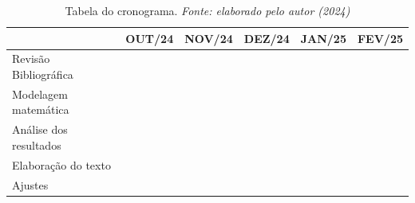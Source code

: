 \documentclass[
	12pt,				%
	openright,			%
	a4paper,			%
	english,			%
	french,				%
	spanish,			%
	brazil				%
	]{article}
\begin{document}
\begin{table}[H]
\begin{tabular}{llllll}
\hline
                        & OUT/24                                          & NOV/24                                          & DEZ/24                                          & JAN/25                                          & FEV/25                   \\ \hline
Revisão Bibliográfica & \cellcolor[HTML]{656565}{\color[HTML]{333333} } & \cellcolor[HTML]{656565}{\color[HTML]{333333} } & \cellcolor[HTML]{656565}{\color[HTML]{333333} } & \cellcolor[HTML]{656565}{\color[HTML]{333333} } & \cellcolor[HTML]{656565} \\ \hline
Modelagem matemática    &                                                 & \cellcolor[HTML]{656565}{\color[HTML]{333333} } & \cellcolor[HTML]{656565}                        &                                                 &                          \\ \hline
Análise dos resultados  &                                                 & \cellcolor[HTML]{656565}{\color[HTML]{333333} } & \cellcolor[HTML]{656565}{\color[HTML]{333333} } & \cellcolor[HTML]{656565}                        &                          \\ \hline
Elaboração do texto     &                                                 &                                                 & \cellcolor[HTML]{656565}{\color[HTML]{333333} } & \cellcolor[HTML]{656565}{\color[HTML]{333333} } & \cellcolor[HTML]{656565} \\ \hline
Ajustes                 &                                                 &                                                 &                                                 &                                                 & \cellcolor[HTML]{656565} \\ \hline
\end{tabular}
\caption{Tabela do cronograma. \textit{Fonte: elaborado pelo autor (2024)}}
\label{table:1}
\end{table}

\printbibliography
\end{document}

